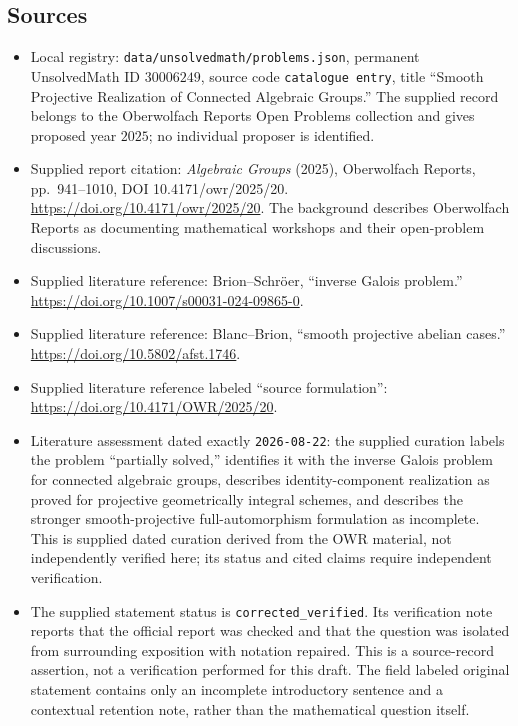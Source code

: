 \documentclass[11pt]{article}
\begin{document}
\subsection{Sources}
\begin{itemize}
\item Local registry: \texttt{data/unsolvedmath/problems.json}, permanent UnsolvedMath ID \(30006249\), source code \texttt{catalogue entry}, title ``Smooth Projective Realization of Connected Algebraic Groups.'' The supplied record belongs to the Oberwolfach Reports Open Problems collection and gives proposed year \(2025\); no individual proposer is identified.
\item Supplied report citation: \emph{Algebraic Groups} (2025), Oberwolfach Reports, pp.\ 941--1010, DOI 10.4171/owr/2025/20. \url{https://doi.org/10.4171/owr/2025/20}. The background describes Oberwolfach Reports as documenting mathematical workshops and their open-problem discussions.
\item Supplied literature reference: Brion--Schr\"oer, ``inverse Galois problem.'' \url{https://doi.org/10.1007/s00031-024-09865-0}.
\item Supplied literature reference: Blanc--Brion, ``smooth projective abelian cases.'' \url{https://doi.org/10.5802/afst.1746}.
\item Supplied literature reference labeled ``source formulation'': \url{https://doi.org/10.4171/OWR/2025/20}.
\item Literature assessment dated exactly \texttt{2026-08-22}: the supplied curation labels the problem ``partially solved,'' identifies it with the inverse Galois problem for connected algebraic groups, describes identity-component realization as proved for projective geometrically integral schemes, and describes the stronger smooth-projective full-automorphism formulation as incomplete. This is supplied dated curation derived from the OWR material, not independently verified here; its status and cited claims require independent verification.
\item The supplied statement status is \texttt{corrected\_verified}. Its verification note reports that the official report was checked and that the question was isolated from surrounding exposition with notation repaired. This is a source-record assertion, not a verification performed for this draft. The field labeled original statement contains only an incomplete introductory sentence and a contextual retention note, rather than the mathematical question itself.
\end{itemize}
\end{document}
